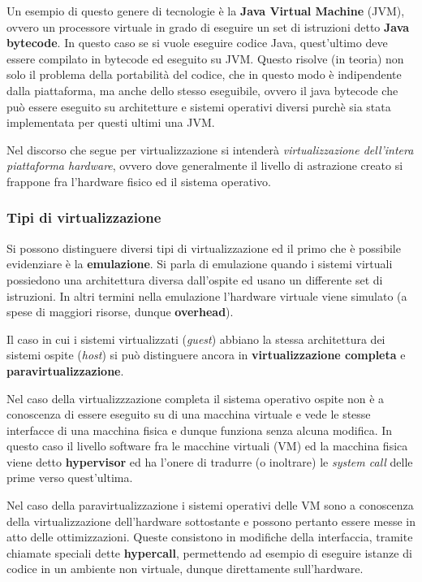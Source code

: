 \documentclass[italian,]{article}
\begin{document}
Un esempio di questo genere di tecnologie è la \textbf{Java Virtual
Machine} (JVM), ovvero un processore virtuale in grado di eseguire un
set di istruzioni detto \textbf{Java bytecode}. In questo caso se si
vuole eseguire codice Java, quest'ultimo deve essere compilato in
bytecode ed eseguito su JVM. Questo risolve (in teoria) non solo il
problema della portabilità del codice, che in questo modo è indipendente
dalla piattaforma, ma anche dello stesso eseguibile, ovvero il java
bytecode che può essere eseguito su architetture e sistemi operativi
diversi purchè sia stata implementata per questi ultimi una JVM.

Nel discorso che segue per virtualizzazione si intenderà
\emph{virtualizzazione dell'intera piattaforma hardware}, ovvero dove
generalmente il livello di astrazione creato si frappone fra l'hardware
fisico ed il sistema operativo.

\subsubsection{Tipi di virtualizzazione}\label{tipi-di-virtualizzazione}

Si possono distinguere diversi tipi di virtualizzazione ed il primo che
è possibile evidenziare è la \textbf{emulazione}. Si parla di emulazione
quando i sistemi virtuali possiedono una architettura diversa
dall'ospite ed usano un differente set di istruzioni. In altri termini
nella emulazione l'hardware virtuale viene simulato (a spese di maggiori
risorse, dunque \textbf{overhead}).

Il caso in cui i sistemi virtualizzati (\emph{guest}) abbiano la stessa
architettura dei sistemi ospite (\emph{host}) si può distinguere ancora
in \textbf{virtualizzazione completa} e \textbf{paravirtualizzazione}.

Nel caso della virtualizzzazione completa il sistema operativo ospite
non è a conoscenza di essere eseguito su di una macchina virtuale e vede
le stesse interfacce di una macchina fisica e dunque funziona senza
alcuna modifica. In questo caso il livello software fra le macchine
virtuali (VM) ed la macchina fisica viene detto \textbf{hypervisor} ed
ha l'onere di tradurre (o inoltrare) le \emph{system call} delle prime
verso quest'ultima.

Nel caso della paravirtualizzazione i sistemi operativi delle VM sono a
conoscenza della virtualizzazione dell'hardware sottostante e possono
pertanto essere messe in atto delle ottimizzazioni. Queste consistono in
modifiche della interfaccia, tramite chiamate speciali dette
\textbf{hypercall}, permettendo ad esempio di eseguire istanze di codice
in un ambiente non virtuale, dunque direttamente sull'hardware.
\end{document}
